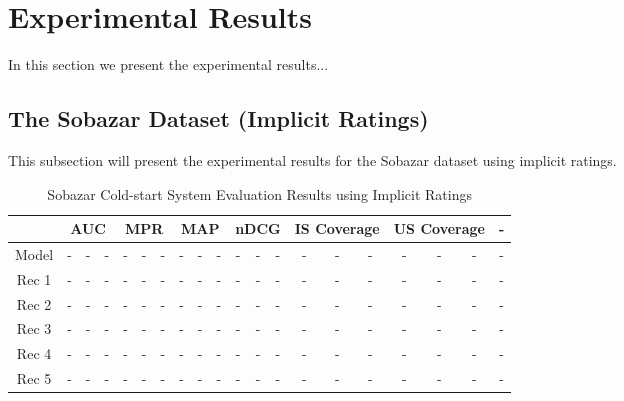 \section{Experimental Results}

In this section we present the experimental results...


\subsection{The Sobazar Dataset (Implicit Ratings)}

This subsection will present the experimental results for the Sobazar dataset using implicit ratings.

\begin{table}
\centering
\begin{tabular}{|c|*{18}{c|}c|}
\hline
&	 \multicolumn{3}{c|}{AUC} & \multicolumn{3}{c|}{MPR} &	 \multicolumn{3}{c|}{MAP} &	 \multicolumn{3}{c|}{nDCG} & \multicolumn{3}{c|}{IS Coverage} & \multicolumn{3}{c|}{US Coverage} & 	-	\\\hline 
Model 		& - & - & - & - & - & - & - & - & - & - & - & - & - & - & - & - & - & - & -  \\ \hline
Rec 1 		& - & - & - & - & - & - & - & - & - & - & - & - & - & - & - & - & - & - & -  \\ \hline
Rec 2 		& - & - & - & - & - & - & - & - & - & - & - & - & - & - & - & - & - & - & -  \\ \hline
Rec 3 		& - & - & - & - & - & - & - & - & - & - & - & - & - & - & - & - & - & - & -  \\ \hline
Rec 4			& - & - & - & - & - & - & - & - & - & - & - & - & - & - & - & - & - & - & -  \\ \hline
Rec 5			& - & - & - & - & - & - & - & - & - & - & - & - & - & - & - & - & - & - & -  \\ \hline
\end{tabular}
\caption{Sobazar Cold-start System Evaluation Results using Implicit Ratings}
\end{table}

